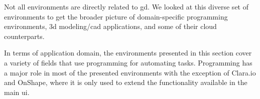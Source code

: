 %
%

Not all environments are directly related to \gls{gd}. We looked at this diverse set of environments to get the broader picture of domain-specific programming environments, 3d modeling/\gls{cad} applications, and some of their cloud counterparts.

In terms of application domain, the environments presented in this section cover a variety of fields that use programming for automating tasks.
Programming has a major role in most of the presented environments with the exception of Clara.io\cite{houston2013clara} and OnShape, where it is only used to extend the functionality available in the main \gls{ui}.

